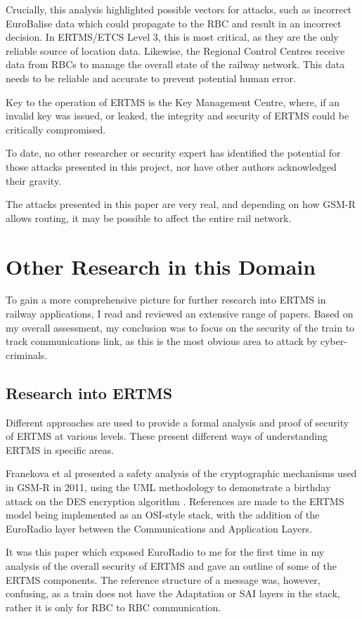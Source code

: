 \documentclass[twoside,11pt,a4paper]{article}
\begin{document}
Crucially, this analysis highlighted possible vectors for attacks, such as incorrect EuroBalise data which could propagate to the RBC and result in an incorrect decision. In ERTMS/ETCS Level 3, this is most critical, as they are the only reliable source of location data. Likewise, the Regional Control Centres receive data from RBCs to manage the overall state of the railway network. This data needs to be reliable and accurate to prevent potential human error.

Key to the operation of ERTMS is the Key Management Centre, where, if an invalid key was issued, or leaked, the integrity and security of ERTMS could be critically compromised.

To date, no other researcher or security expert has identified the potential for those attacks presented in this project, nor have other authors acknowledged their gravity.

The attacks presented in this paper are very real, and depending on how GSM-R allows routing, it may be possible to affect the entire rail network.
\clearpage

\section{Other Research in this Domain}
To gain a more comprehensive picture for further research into ERTMS in railway applications, I read and reviewed an extensive range of papers. Based on my overall assessment, my conclusion was to focus on the security of the train to track communications link, as this is the most obvious area to attack by cyber-criminals.
\subsection{Research into ERTMS}
Different approaches are used to provide a formal analysis and proof of security of ERTMS at various levels. These present different ways of understanding ERTMS in specific areas.

Franekova et al presented a safety analysis of the cryptographic mechanisms used in {GSM-R} in 2011, using the UML methodology to demonstrate a birthday attack on the DES encryption algorithm \citep{Franekova11a}. References are made to the ERTMS model being implemented as an OSI-style stack, with the addition of the EuroRadio layer between the Communications and Application Layers.

It was this paper which exposed EuroRadio to me for the first time in my analysis of the overall security of ERTMS and gave an outline of some of the ERTMS components. The reference structure of a message was, however, confusing, as a train does not have the Adaptation or SAI layers in the stack, rather it is only for RBC to RBC communication. 
\end{document}
